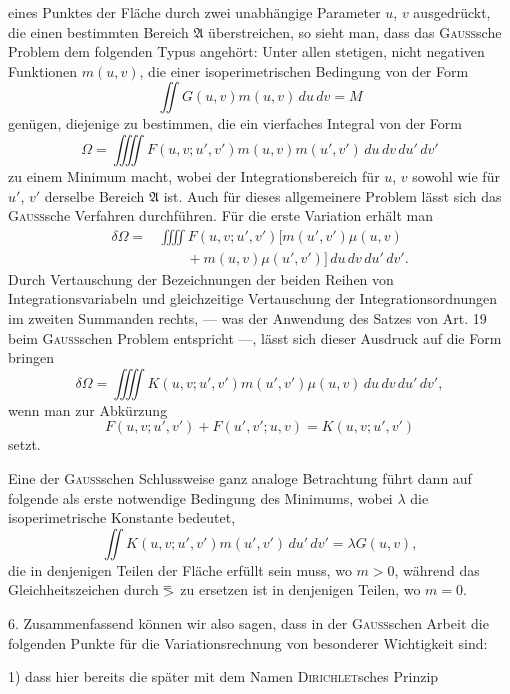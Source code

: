 eines Punktes der Fläche durch zwei unabhängige Parameter $u$, $v$ ausgedrückt,
die einen bestimmten Bereich $\mathfrak A$ überstreichen, so sieht man, dass das \textsc{Gauss}sche Problem dem folgenden Typus angehört: Unter allen stetigen, nicht
\clearpage{}
\noindent negativen Funktionen $m(u,v)$, die einer isoperimetrischen Bedingung von der
Form
\[
\iint G(u,v)m(u,v)\,du\,dv=M
\]
genügen, diejenige zu bestimmen, die ein vierfaches Integral von der Form
\[
\Omega=\iiiint F(u,v;u',v')m(u,v)m(u',v')\,du\,dv\,du'\,dv'
\]
zu einem Minimum macht, wobei der Integrationsbereich für $u$, $v$ sowohl wie
für $u'$, $v'$ derselbe Bereich $\mathfrak A$ ist. Auch für dieses allgemeinere Problem lässt
sich das \textsc{Gauss}sche Verfahren durchführen. Für die erste Variation erhält man
\[
\begin{aligned}
\delta\Omega={}&\iiiint F(u,v;u',v')\bigl[m(u',v')\mu(u,v)\\
&\qquad+m(u,v)\mu(u',v')\bigr]\,du\,dv\,du'\,dv'.
\end{aligned}
\]
Durch Vertauschung der Bezeichnungen der beiden Reihen von Integrationsvariabeln und gleichzeitige Vertauschung der Integrationsordnungen im zweiten
Summanden rechts, — was der Anwendung des Satzes von Art. 19 beim
\textsc{Gauss}schen Problem entspricht —, lässt sich dieser Ausdruck auf die Form
bringen
\[
\delta\Omega=\iiiint K(u,v;u',v')m(u',v')\mu(u,v)\,du\,dv\,du'\,dv',
\]
wenn man zur Abkürzung
\[
F(u,v;u',v')+F(u',v';u,v)=K(u,v;u',v')
\]
setzt.
\par\noindent\hspace*{\parindent}Eine der \textsc{Gauss}schen Schlussweise ganz analoge Betrachtung führt dann
auf folgende  als erste notwendige Bedingung
des Minimums, wobei $\lambda$ die isoperimetrische Konstante bedeutet,
\[
\iint K(u,v;u',v')m(u',v')\,du'\,dv'=\lambda G(u,v),
\]
die in denjenigen Teilen der Fläche erfüllt sein muss, wo $m>0$, während
das Gleichheitszeichen durch $\BolzaEqualAboveGreater$ zu ersetzen ist in denjenigen Teilen, wo
$m=0$.
\par\noindent\hspace*{\parindent}6. Zusammenfassend können wir also sagen, dass in der \textsc{Gauss}schen
Arbeit die folgenden Punkte für die Variationsrechnung von besonderer
Wichtigkeit sind:
\par\noindent\hspace*{\parindent}1) dass hier bereits die später mit dem Namen \textsc{Dirichlet}sches Prinzip
